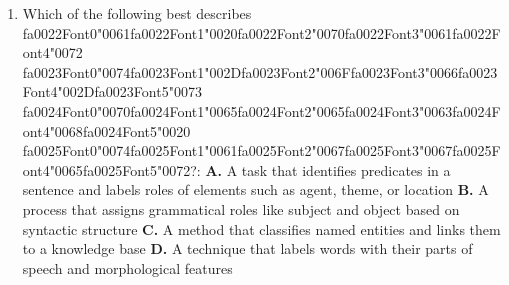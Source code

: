 \documentclass[11pt]{article}
\begin{document}
\begin{enumerate}[leftmargin=*]
  \item Which of the following best describes {\csname fa0022Font0\endcsname\char"0061}{\csname fa0022Font1\endcsname\char"0020}{\csname fa0022Font2\endcsname\char"0070}{\csname fa0022Font3\endcsname\char"0061}{\csname fa0022Font4\endcsname\char"0072} {\csname fa0023Font0\endcsname\char"0074}{\csname fa0023Font1\endcsname\char"002D}{\csname fa0023Font2\endcsname\char"006F}{\csname fa0023Font3\endcsname\char"0066}{\csname fa0023Font4\endcsname\char"002D}{\csname fa0023Font5\endcsname\char"0073} {\csname fa0024Font0\endcsname\char"0070}{\csname fa0024Font1\endcsname\char"0065}{\csname fa0024Font2\endcsname\char"0065}{\csname fa0024Font3\endcsname\char"0063}{\csname fa0024Font4\endcsname\char"0068}{\csname fa0024Font5\endcsname\char"0020} {\csname fa0025Font0\endcsname\char"0074}{\csname fa0025Font1\endcsname\char"0061}{\csname fa0025Font2\endcsname\char"0067}{\csname fa0025Font3\endcsname\char"0067}{\csname fa0025Font4\endcsname\char"0065}{\csname fa0025Font5\endcsname\char"0072}?:
    \textbf{A.} A task that identifies predicates in a sentence and labels roles of elements such as agent, theme, or location
    \textbf{B.} A process that assigns grammatical roles like subject and object based on syntactic structure
    \textbf{C.} A method that classifies named entities and links them to a knowledge base
    \textbf{D.} A technique that labels words with their parts of speech and morphological features


\end{enumerate}
\end{document}
